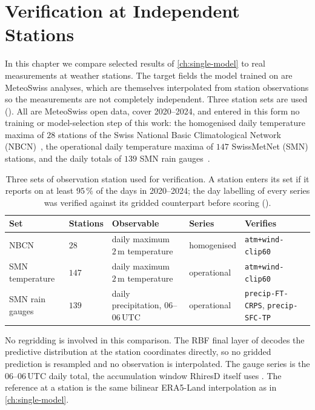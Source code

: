 \chapter{Verification at Independent Stations}\label{ch:stations}
In this chapter we compare selected results of  \cref{ch:single-model} to real measurements at weather stations. The target fields the model trained on are MeteoSwiss analyses, which are
themselves interpolated from station observations \cite{meteoswiss_ogd_grid} so the measurements are not completely independent. Three station sets
are used (). All are MeteoSwiss open data, cover 2020--2024, and entered in this form no
training or model-selection step of this work: the homogenised daily temperature maxima of $28$ stations of the
Swiss National Basic Climatological Network (NBCN)~\cite{begert2005homogeneous,meteoswiss_ogd_nbcn},
the operational daily temperature maxima of $147$ SwissMetNet (SMN) stations, and the daily totals of $139$ SMN
rain gauges~\cite{meteoswiss_ogd_smn}.

\begin{table}[H]
\centering
\caption[Reference Meteorological Observations at Stations]{Three sets of observation station used for verification. A station enters its
set if it reports on at least $95\,\%$ of the days in 2020--2024; the day labelling of every series
was verified against its gridded counterpart before scoring ().}
\label{tab:stations-sets}
\footnotesize
\setlength{\tabcolsep}{4pt}
\begin{tabular}{|p{2.2cm}|p{1.5cm}|p{4.6cm}|p{2.2cm}|p{3.2cm}|}
\hline
\textbf{Set} & \textbf{Stations} & \textbf{Observable} & \textbf{Series} & \textbf{Verifies} \\
\hline
NBCN & $28$ & daily maximum $2\,\mathrm{m}$ temperature & homogenised & \texttt{atm+wind-clip60} \\
\hline
SMN temperature & $147$ & daily maximum $2\,\mathrm{m}$ temperature & operational & \texttt{atm+wind-clip60} \\
\hline
SMN rain gauges & $139$ & daily precipitation, $06$--$06\,\mathrm{UTC}$ & operational & \texttt{precip-FT-CRPS}, \texttt{precip-SFC-TP} \\
\hline
\end{tabular}
\end{table}

No regridding is involved in this comparison. The RBF final layer of 
decodes the predictive distribution at the station coordinates directly, so no gridded prediction is
resampled and no observation is interpolated. The gauge series is the $06$--$06\,\mathrm{UTC}$ daily
total, the accumulation window RhiresD itself uses \cite{meteoswiss_rhiresd_doc}. The reference at a
station is the same bilinear ERA5-Land interpolation as in \cref{ch:single-model}. 

